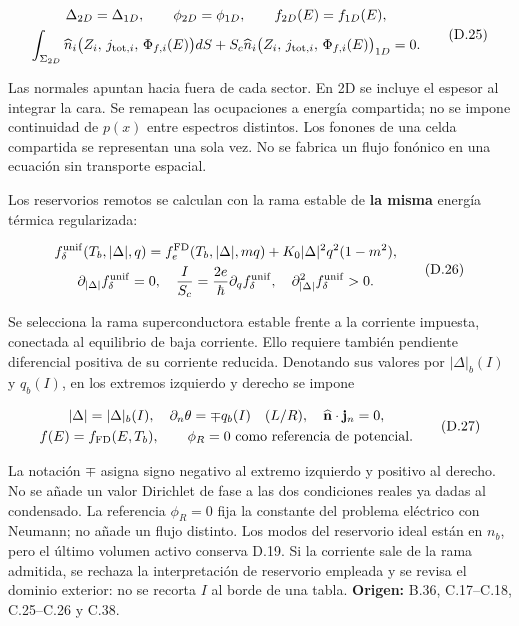 \documentclass[
  spanish,
  10pt,
  a4paper,
]{article}
\newcounter{none} %
\begin{document}
\[
\begin{gathered}
\Delta_{2D}=\Delta_{1D},\qquad\phi_{2D}=\phi_{1D},\qquad
f_{2D}(E)=f_{1D}(E),\\
\int_{\Sigma_{2D}}\widehat n_i\bigl(Z_i,\,j_{{\rm tot},i},\,\Phi_{f,i}(E)\bigr)dS
+S_c\widehat n_i\bigl(Z_i,\,j_{{\rm tot},i},\,\Phi_{f,i}(E)\bigr)_{1D}=0.
\end{gathered}\tag{D.25}
\]

Las normales apuntan hacia fuera de cada sector. En 2D se incluye el
espesor al integrar la cara. Se remapean las ocupaciones a energía
compartida; no se impone continuidad de \(p(x)\) entre espectros
distintos. Los fonones de una celda compartida se representan una sola
vez. No se fabrica un flujo fonónico en una ecuación sin transporte
espacial.

Los reservorios remotos se calculan con la rama estable de \textbf{la
misma} energía térmica regularizada:

\[
\begin{gathered}
f_\delta^{\rm unif}(T_b,|\Delta|,q)
=f_e^{\rm FD}(T_b,|\Delta|,mq)
+K_0|\Delta|^2q^2(1-m^2),\\
\partial_{|\Delta|}f_\delta^{\rm unif}=0,\quad
\frac{I}{S_c}=\frac{2e}{\hbar}\partial_q f_\delta^{\rm unif},\quad
\partial_{|\Delta|}^2f_\delta^{\rm unif}>0.
\end{gathered}\tag{D.26}
\]

Se selecciona la rama superconductora estable frente a la corriente
impuesta, conectada al equilibrio de baja corriente. Ello requiere
también pendiente diferencial positiva de su corriente reducida.
Denotando sus valores por \(|\Delta|_b(I)\) y \(q_b(I)\), en los
extremos izquierdo y derecho se impone

\[
\begin{gathered}
|\Delta|=|\Delta|_b(I),\quad \partial_n\theta=\mp q_b(I)
\quad(L/R),\quad \widehat{\mathbf n}\cdot\mathbf j_n=0,\\
f(E)=f_{\rm FD}(E,T_b),\qquad \phi_R=0\ \text{como referencia de potencial}.
\end{gathered}\tag{D.27}
\]

La notación \(\mp\) asigna signo negativo al extremo izquierdo y
positivo al derecho. No se añade un valor Dirichlet de fase a las dos
condiciones reales ya dadas al condensado. La referencia \(\phi_R=0\)
fija la constante del problema eléctrico con Neumann; no añade un flujo
distinto. Los modos del reservorio ideal están en \(n_b\), pero el
último volumen activo conserva D.19. Si la corriente sale de la rama
admitida, se rechaza la interpretación de reservorio empleada y se
revisa el dominio exterior: no se recorta \(I\) al borde de una tabla.
\textbf{Origen:} B.36, C.17--C.18, C.25--C.26 y C.38.
\end{document}
